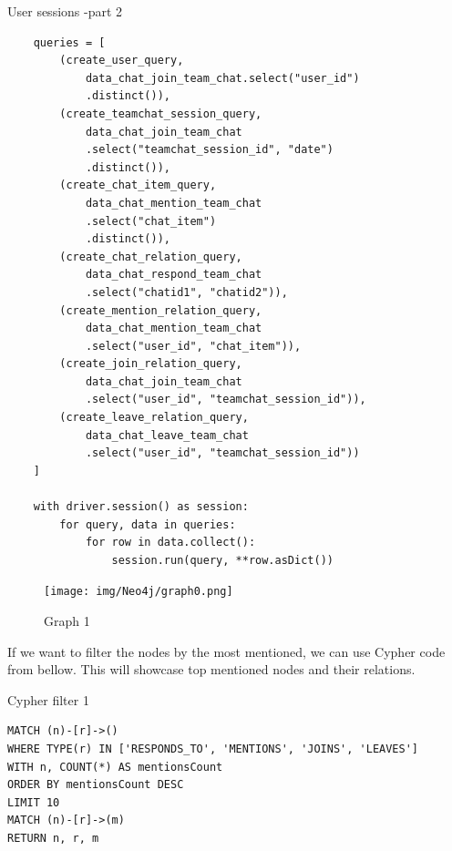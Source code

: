 \begin{listing}[H]
\caption{User sessions -part 2}
\begin{verbatim}
    queries = [
        (create_user_query, 
            data_chat_join_team_chat.select("user_id")
            .distinct()),
        (create_teamchat_session_query, 
            data_chat_join_team_chat
            .select("teamchat_session_id", "date")
            .distinct()),
        (create_chat_item_query, 
            data_chat_mention_team_chat
            .select("chat_item")
            .distinct()),
        (create_chat_relation_query, 
            data_chat_respond_team_chat
            .select("chatid1", "chatid2")),
        (create_mention_relation_query, 
            data_chat_mention_team_chat
            .select("user_id", "chat_item")),
        (create_join_relation_query, 
            data_chat_join_team_chat
            .select("user_id", "teamchat_session_id")),
        (create_leave_relation_query, 
            data_chat_leave_team_chat
            .select("user_id", "teamchat_session_id"))
    ]

    with driver.session() as session:
        for query, data in queries:
            for row in data.collect():
                session.run(query, **row.asDict())
\end{verbatim}
\end{listing}

\begin{landscape}
  \begin{figure}[H]
    \texttt{[image: img/Neo4j/graph0.png]}
    \centering
    \caption{Graph 1}
    \label{fig:Graph 1}
  \end{figure}
\end{landscape}

If we want to filter the nodes by the most mentioned, we can use Cypher code from bellow. This will showcase top mentioned nodes and their relations.

\begin{listing}[H]
\caption{Cypher filter 1}
\begin{verbatim}
MATCH (n)-[r]->()
WHERE TYPE(r) IN ['RESPONDS_TO', 'MENTIONS', 'JOINS', 'LEAVES']
WITH n, COUNT(*) AS mentionsCount
ORDER BY mentionsCount DESC
LIMIT 10
MATCH (n)-[r]->(m)
RETURN n, r, m
\end{verbatim}
\end{listing}

